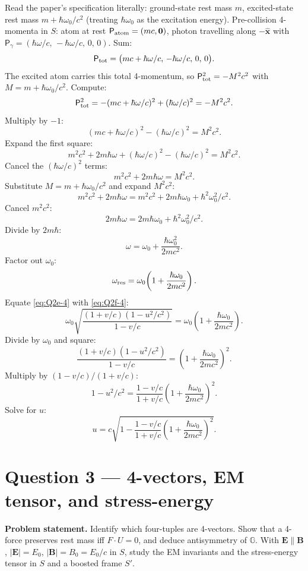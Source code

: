 \documentclass[11pt]{article}
\begin{document}
Read the paper's specification literally: ground-state rest mass $m$, excited-state rest mass $m+\hbar\omega_0/c^2$ (treating $\hbar\omega_0$ as the excitation energy). Pre-collision 4-momenta in $S$: atom at rest $\mathsf P_{\rm atom}=(mc,\bm 0)$, photon travelling along $-\hat{\bm x}$ with $\mathsf P_\gamma = (\hbar\omega/c,\,-\hbar\omega/c,\,0,\,0)$. Sum:
\[ \mathsf P_{\rm tot} = \bigl(mc+\hbar\omega/c,\,-\hbar\omega/c,\,0,\,0\bigr). \]
The excited atom carries this total 4-momentum, so $\mathsf P_{\rm tot}^2 = -M^2 c^2$ with $M = m+\hbar\omega_0/c^2$. Compute:
\[ \mathsf P_{\rm tot}^2 = -(mc+\hbar\omega/c)^2 + (\hbar\omega/c)^2 = -M^2 c^2. \]
Multiply by $-1$:
\[ (mc+\hbar\omega/c)^2 - (\hbar\omega/c)^2 = M^2 c^2. \]
Expand the first square:
\[ m^2 c^2 + 2m\hbar\omega + (\hbar\omega/c)^2 - (\hbar\omega/c)^2 = M^2 c^2. \]
Cancel the $(\hbar\omega/c)^2$ terms:
\[ m^2 c^2 + 2m\hbar\omega = M^2 c^2. \]
Substitute $M = m+\hbar\omega_0/c^2$ and expand $M^2 c^2$:
\[ m^2 c^2 + 2m\hbar\omega = m^2 c^2 + 2m\hbar\omega_0 + \hbar^2\omega_0^2/c^2. \]
Cancel $m^2 c^2$:
\[ 2m\hbar\omega = 2m\hbar\omega_0 + \hbar^2\omega_0^2/c^2. \]
Divide by $2m\hbar$:
\[ \omega = \omega_0 + \frac{\hbar\omega_0^2}{2mc^2}. \]
Factor out $\omega_0$:
\begin{equation}
\omega_{\rm res} = \omega_0\!\left(1+\frac{\hbar\omega_0}{2mc^2}\right).
\label{eq:Q2f-4}
\end{equation}
Equate \eqref{eq:Q2e-4} with \eqref{eq:Q2f-4}:
\[ \omega_0\sqrt{\frac{(1+v/c)(1-u^2/c^2)}{1-v/c}} = \omega_0\!\left(1+\frac{\hbar\omega_0}{2mc^2}\right). \]
Divide by $\omega_0$ and square:
\[ \frac{(1+v/c)(1-u^2/c^2)}{1-v/c} = \!\left(1+\frac{\hbar\omega_0}{2mc^2}\right)^{\!2}. \]
Multiply by $(1-v/c)/(1+v/c)$:
\[ 1-u^2/c^2 = \frac{1-v/c}{1+v/c}\!\left(1+\frac{\hbar\omega_0}{2mc^2}\right)^{\!2}. \]
Solve for $u$:
\begin{equation}
\boxed{u = c\sqrt{1 - \frac{1-v/c}{1+v/c}\!\left(1+\frac{\hbar\omega_0}{2mc^2}\right)^{\!2}}.}
\end{equation}

\section*{Question 3 --- 4-vectors, EM tensor, and stress-energy}

\textbf{Problem statement.} Identify which four-tuples are 4-vectors. Show that a 4-force preserves rest mass iff $F\cdot U=0$, and deduce antisymmetry of $\mathbb{G}$. With $\bm E\parallel\bm B$, $|\bm E|=E_0$, $|\bm B|=B_0=E_0/c$ in $S$, study the EM invariants and the stress-energy tensor in $S$ and a boosted frame $S'$.
\end{document}
